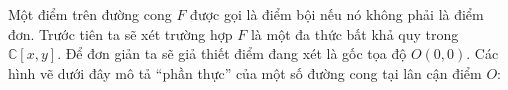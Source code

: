\begin{multicols}{2}
	\vskip 0.1cm 
	Một điểm trên đường cong $F$  được gọi là điểm bội nếu nó không phải là điểm đơn. Trước tiên ta sẽ xét trường hợp $F$ là một đa thức bất khả quy trong $\mathbb C[x,y]$. Để đơn giản ta sẽ giả thiết điểm đang xét là gốc tọa độ $O(0,0)$. Các hình vẽ dưới đây mô tả ``phần thực'' của một số đường cong tại lân cận điểm $O$:
	

\end{multicols}
